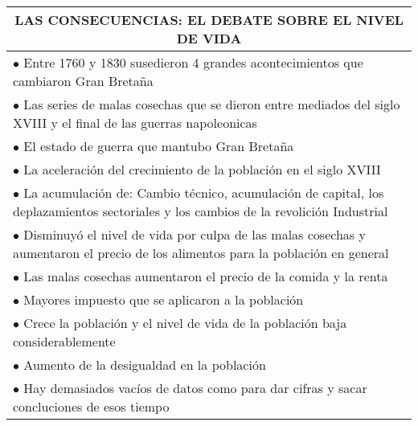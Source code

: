 \begingroup
\setlength{\tabcolsep}{12pt} %
\renewcommand{\arraystretch}{1.5} %
\begin{tabular}{p{15cm}}
  \multicolumn{1}{c}{\large LAS CONSECUENCIAS: EL DEBATE SOBRE EL NIVEL DE VIDA}                                                                             \\ \hline
  $\bullet$ Entre 1760 y 1830 susedieron 4 grandes acontecimientos que cambiaron Gran Bretaña                                                                \\
  \hspace{1cm} $\bullet$ Las series de malas cosechas que se dieron entre mediados del siglo XVIII y el final de las guerras napoleonicas                    \\
  \hspace{1cm} $\bullet$ El estado de guerra que mantubo Gran Bretaña                                                                                        \\
  \hspace{1cm} $\bullet$ La aceleración del crecimiento de la población en el siglo XVIII                                                                    \\
  \hspace{1cm} $\bullet$ La acumulación de: Cambio técnico, acumulación de capital, los deplazamientos sectoriales y los cambios de la revolición Industrial \\
  $\bullet$ Disminuyó el nivel de vida por culpa de las malas cosechas y aumentaron el precio de los alimentos para la población en general                  \\
  $\bullet$ Las malas cosechas aumentaron el precio de la comida y la renta                                                                                  \\
  $\bullet$ Mayores impuesto que se aplicaron a la población                                                                                                 \\
  $\bullet$ Crece la población y el nivel de vida de la población baja considerablemente                                                                     \\
  $\bullet$ Aumento de la desigualdad en la población                                                                                                        \\
  $\bullet$ Hay demasiados vacíos de datos como para dar cifras y sacar concluciones de esos tiempo                                                          \\

\end{tabular}
